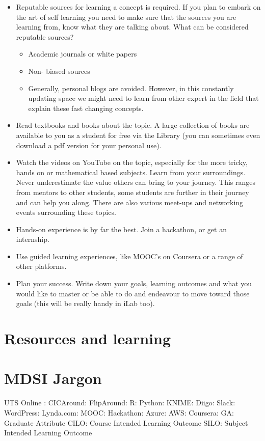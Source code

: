 \documentclass[]{book}
\providecommand{\tightlist}{%
  \setlength{\itemsep}{0pt}\setlength{\parskip}{0pt}}
\theoremstyle{definition}
\theoremstyle{definition}
\theoremstyle{remark}
\begin{document}
\begin{itemize}
\tightlist
\item
  Reputable sources for learning a concept is required. If you plan to
  embark on the art of self learning you need to make sure that the
  sources you are learning from, know what they are talking about. What
  can be considered reputable sources?

  \begin{itemize}
  \tightlist
  \item
    Academic journals or white papers
  \item
    Non- biased sources
  \item
    Generally, personal blogs are avoided. However, in this constantly
    updating space we might need to learn from other expert in the field
    that explain these fast changing concepts.
  \end{itemize}
\item
  Read textbooks and books about the topic. A large collection of books
  are available to you as a student for free via the Library (you can
  sometimes even download a pdf version for your personal use).
\item
  Watch the videos on YouTube on the topic, especially for the more
  tricky, hands on or mathematical based subjects. Learn from your
  surroundings. Never underestimate the value others can bring to your
  journey. This ranges from mentors to other students, some students are
  further in their journey and can help you along. There are also
  various meet-ups and networking events surrounding these topics.
\item
  Hands-on experience is by far the best. Join a hackathon, or get an
  internship.
\item
  Use guided learning experiences, like MOOC's on Coursera or a range of
  other platforms.
\item
  Plan your success. Write down your goals, learning outcomes and what
  you would like to master or be able to do and endeavour to move toward
  those goals (this will be really handy in iLab too).
\end{itemize}

\section{Resources and learning}\label{resources-and-learning}

\section{MDSI Jargon}\label{mdsi-jargon}

UTS Online : CICAround: FlipAround: R: Python: KNIME: Diigo: Slack:
WordPress: Lynda.com: MOOC: Hackathon: Azure: AWS: Coursera: GA:
Graduate Attribute CILO: Course Intended Learning Outcome SILO: Subject
Intended Learning Outcome


\end{document}
